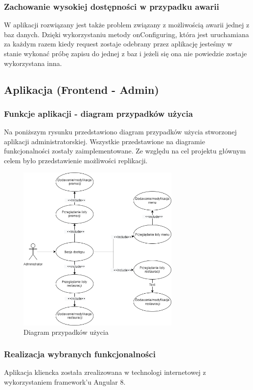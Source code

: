 \documentclass{article}
\begin{document}
		\subsubsection{Zachowanie wysokiej dostępności w przypadku awarii}
		W aplikacji rozwiązany jest także problem związany z możliwością awarii jednej z baz danych. Dzięki wykorzystaniu metody onConfiguring, która jest uruchamiana za każdym razem kiedy request zostaje odebrany przez aplikację jesteśmy w stanie wykonać próbę zapisu do jednej z baz i jeżeli się ona nie powiedzie zostaje wykorzystana inna.
	\newpage
	\subsection{Aplikacja (Frontend - Admin)}
		\subsubsection{Funkcje aplikacji - diagram przypadków użycia}
		Na poniższym rysunku przedstawiono diagram przypadków użycia stworzonej aplikacji administratorskiej. Wszystkie przedstawione na diagramie funkcjonalności zostały zaimplementowane. Ze względu na cel projektu głównym celem było przedstawienie możliwości replikacji.
			\begin{figure}[hbt!]
				\includegraphics[width=8cm]{Files/Pictures/UMLAdminApp}
				\centering
				\caption{Diagram przypadków użycia}
			\end{figure}
		\subsubsection{Realizacja wybranych funkcjonalności}
		Aplikacja kliencka została zrealizowana w technologi internetowej z wykorzystaniem framework'u Angular 8.
\end{document}
